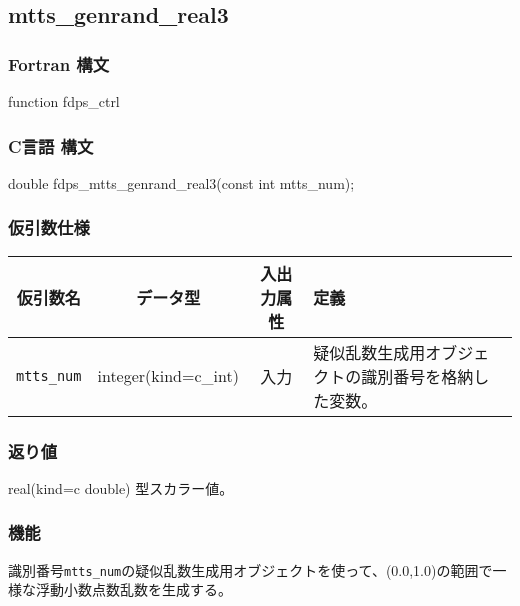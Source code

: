 \subsection{mtts\_genrand\_real3}
\subsubsection*{Fortran 構文}
\begin{screen}
\begin{spverbatim}  
function fdps_ctrl%
\end{spverbatim}
\end{screen}

\subsubsection*{C言語 構文}
\begin{screen}
\begin{spverbatim}  
double fdps_mtts_genrand_real3(const int mtts_num);
\end{spverbatim}
\end{screen}

\subsubsection*{仮引数仕様}
\begin{table}[h]
\begin{tabularx}{\linewidth}{cccX}
\toprule
\rowcolor{Snow2}
仮引数名 & データ型 & 入出力属性 & 定義 \\
\midrule
\verb|mtts_num| & integer(kind=c\_int) & 入力 & 疑似乱数生成用オブジェクトの識別番号を格納した変数。\\
\bottomrule
\end{tabularx}
\end{table}

\subsubsection*{返り値}
real(kind=c double) 型スカラー値。

\subsubsection*{機能}
識別番号\texttt{mtts\_num}の疑似乱数生成用オブジェクトを使って、(0.0,1.0)の範囲で一様な浮動小数点数乱数を生成する。
\clearpage

